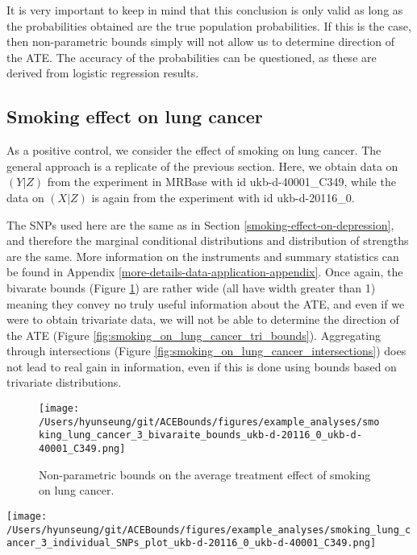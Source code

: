 \documentclass[
]{article}
\theoremstyle{plain}
\begin{document}
{It is very important to keep in mind that this conclusion is only valid as long as the probabilities obtained are the true population probabilities. If this is the case, then non-parametric bounds simply will not allow us to determine direction of the ATE. The accuracy of the probabilities can be questioned, as these are derived from logistic regression results.

\hypertarget{smoking-effect-on-lung-cancer}{%
\subsection{Smoking effect on lung cancer}\label{smoking-effect-on-lung-cancer}}

As a positive control, we consider the effect of smoking on lung cancer. The general approach is a replicate of the previous section. Here, we obtain data on \((Y|Z)\) from the experiment in MRBase with id ukb-d-40001\_C349, while the data on \((X|Z)\) is again from the experiment with id ukb-d-20116\_0.

The SNPs used here are the same as in Section \ref{smoking-effect-on-depression}, and therefore the marginal conditional distributions and distribution of strengths are the same. More information on the instruments and summary statistics can be found in Appendix \ref{more-details-data-application-appendix}. Once again, the bivarate bounds (Figure \ref{fig:smoking_on_lung_cancer_ind_bounds}) are rather wide (all have width greater than 1) meaning they convey no truly useful information about the ATE, and even if we were to obtain trivariate data, we will not be able to determine the direction of the ATE (Figure \ref{fig:smoking_on_lung_cancer_tri_bounds}). Aggregating through intersections (Figure \ref{fig:smoking_on_lung_cancer_intersections}) does not lead to real gain in information, even if this is done using bounds based on trivariate distributions.

\begin{figure}[H]
  \texttt{[image: /Users/hyunseung/git/ACEBounds/figures/example\_analyses/smoking\_lung\_cancer\_3\_bivaraite\_bounds\_ukb-d-20116\_0\_ukb-d-40001\_C349.png]}
  \caption{Non-parametric bounds on the average treatment effect of smoking on lung cancer.}
  \label{fig:smoking_on_lung_cancer_ind_bounds}
\end{figure}

\clearpage

\begin{sidewaysfigure}
  \texttt{[image: /Users/hyunseung/git/ACEBounds/figures/example\_analyses/smoking\_lung\_cancer\_3\_individual\_SNPs\_plot\_ukb-d-20116\_0\_ukb-d-40001\_C349.png]}
    \caption{500 sets of bounds of the average treatment effect of smoking on lung cancer for each of the 84 SNPs. Each bound is based on a set of values for the trivariate distribution randomyl sampled. Bounds are color coded to show if they overlap 0 (grey) or do not (red). All bounds overlap 0.}
    \label{fig:smoking_on_lung_cancer_tri_bounds}
\end{sidewaysfigure}

}
\end{document}
